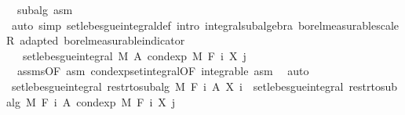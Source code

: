 \begin{isabellebody}
\ {\isacharasterisk}{\kern0pt}\ subalg\ asm\ \isamarkupfalse%
\ {\isacharparenleft}{\kern0pt}auto\ simp{\isacharcolon}{\kern0pt}\ set{\isacharunderscore}{\kern0pt}lebesgue{\isacharunderscore}{\kern0pt}integral{\isacharunderscore}{\kern0pt}def\ intro{\isacharcolon}{\kern0pt}\ integral{\isacharunderscore}{\kern0pt}subalgebra{}\ borel{\isacharunderscore}{\kern0pt}measurable{\isacharunderscore}{\kern0pt}scaleR\ adapted\ borel{\isacharunderscore}{\kern0pt}measurable{\isacharunderscore}{\kern0pt}indicator{\isacharparenright}{\kern0pt}\ \isanewline
\ \ \ \ \isamarkupfalse%
\ \isamarkupfalse%
\ {\isachardoublequoteopen}{\isachardot}{\kern0pt}{\isachardot}{\kern0pt}{\isachardot}{\kern0pt}\ {\isacharequal}{\kern0pt}\ set{\isacharunderscore}{\kern0pt}lebesgue{\isacharunderscore}{\kern0pt}integral\ M\ A\ {\isacharparenleft}{\kern0pt}cond{\isacharunderscore}{\kern0pt}exp\ M\ {\isacharparenleft}{\kern0pt}F\ i{\isacharparenright}{\kern0pt}\ {\isacharparenleft}{\kern0pt}X\ j{\isacharparenright}{\kern0pt}{\isacharparenright}{\kern0pt}{\isachardoublequoteclose}\ \isamarkupfalse%
\ {\isacharasterisk}{\kern0pt}\ assms{\isacharparenleft}{\kern0pt}{}{\isacharparenright}{\kern0pt}{\isacharbrackleft}{\kern0pt}OF\ asm{\isacharbrackright}{\kern0pt}\ cond{\isacharunderscore}{\kern0pt}exp{\isacharunderscore}{\kern0pt}set{\isacharunderscore}{\kern0pt}integral{\isacharbrackleft}{\kern0pt}OF\ integrable{\isacharbrackright}{\kern0pt}\ asm\ \isamarkupfalse%
\ auto\isanewline
\ \ \ \ \isamarkupfalse%
\ \isamarkupfalse%
\ {\isachardoublequoteopen}set{\isacharunderscore}{\kern0pt}lebesgue{\isacharunderscore}{\kern0pt}integral\ {\isacharparenleft}{\kern0pt}restr{\isacharunderscore}{\kern0pt}to{\isacharunderscore}{\kern0pt}subalg\ M\ {\isacharparenleft}{\kern0pt}F\ i{\isacharparenright}{\kern0pt}{\isacharparenright}{\kern0pt}\ A\ {\isacharparenleft}{\kern0pt}X\ i{\isacharparenright}{\kern0pt}\ {\isacharequal}{\kern0pt}\ set{\isacharunderscore}{\kern0pt}lebesgue{\isacharunderscore}{\kern0pt}integral\ {\isacharparenleft}{\kern0pt}restr{\isacharunderscore}{\kern0pt}to{\isacharunderscore}{\kern0pt}subalg\ M\ {\isacharparenleft}{\kern0pt}F\ i{\isacharparenright}{\kern0pt}{\isacharparenright}{\kern0pt}\ A\ {\isacharparenleft}{\kern0pt}cond{\isacharunderscore}{\kern0pt}exp\ M\ {\isacharparenleft}{\kern0pt}F\ i{\isacharparenright}{\kern0pt}\ {\isacharparenleft}{\kern0pt}X\ j{\isacharparenright}{\kern0pt}{\isacharparenright}{\kern0pt}{\isachardoublequoteclose}\ \isamarkupfalse%

\end{isabellebody}
